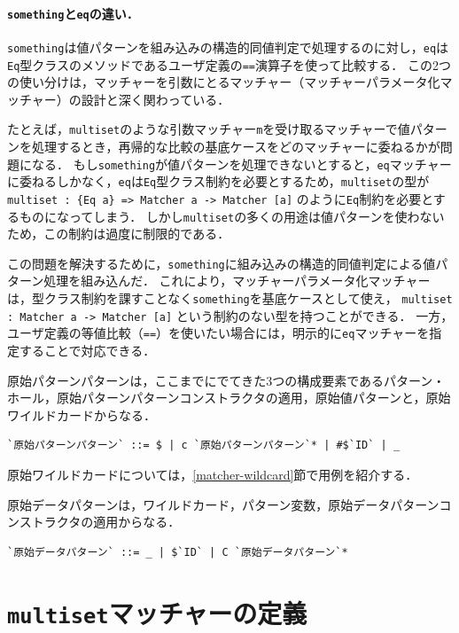 \paragraph{\texttt{something}と\texttt{eq}の違い．}
\lstinline{something}は値パターンを組み込みの構造的同値判定で処理するのに対し，\lstinline{eq}は\lstinline{Eq}型クラスのメソッドであるユーザ定義の\lstinline{==}演算子を使って比較する．
この2つの使い分けは，マッチャーを引数にとるマッチャー（マッチャーパラメータ化マッチャー）の設計と深く関わっている．

たとえば，\lstinline{multiset}のような引数マッチャー\lstinline{m}を受け取るマッチャーで値パターンを処理するとき，再帰的な比較の基底ケースをどのマッチャーに委ねるかが問題になる．
もし\lstinline{something}が値パターンを処理できないとすると，\lstinline{eq}マッチャーに委ねるしかなく，\lstinline{eq}は\lstinline{Eq}型クラス制約を必要とするため，\lstinline{multiset}の型が
\lstinline|multiset : {Eq a} => Matcher a -> Matcher [a]|
のように\lstinline{Eq}制約を必要とするものになってしまう．
しかし\lstinline{multiset}の多くの用途は値パターンを使わないため，この制約は過度に制限的である．

この問題を解決するために，\lstinline{something}に組み込みの構造的同値判定による値パターン処理を組み込んだ．
これにより，マッチャーパラメータ化マッチャーは，型クラス制約を課すことなく\lstinline{something}を基底ケースとして使え，
\lstinline|multiset : Matcher a -> Matcher [a]|
という制約のない型を持つことができる．
一方，ユーザ定義の等値比較（\lstinline{==}）を使いたい場合には，明示的に\lstinline{eq}マッチャーを指定することで対応できる．

原始パターンパターンは，ここまでにでてきた3つの構成要素であるパターン・ホール，原始パターンパターンコンストラクタの適用，原始値パターンと，原始ワイルドカードからなる．
\begin{lstlisting}[language=egison,numbers=none]
`原始パターンパターン` ::= $ | c `原始パターンパターン`* | #$`ID` | _
\end{lstlisting}
原始ワイルドカードについては，\ref{matcher-wildcard}節で用例を紹介する．

原始データパターンは，ワイルドカード，パターン変数，原始データパターンコンストラクタの適用からなる．
\begin{lstlisting}[language=egison,numbers=none]
`原始データパターン` ::= _ | $`ID` | C `原始データパターン`*
\end{lstlisting}

\section{\texttt{multiset}マッチャーの定義}\label{matcher-multiset}

